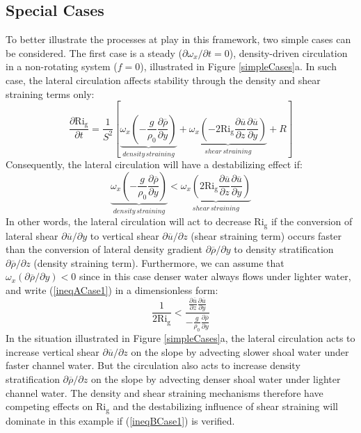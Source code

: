 \subsection{Special Cases}
To better illustrate the processes at play in this framework, two simple cases can be considered. The first case is a steady ($\partial \omega_x / \partial t = 0$), density-driven circulation in a non-rotating system ($f = 0$), illustrated in Figure \ref{simpleCases}a. In such case, the lateral circulation affects stability through the density and shear straining terms only:
\begin{equation}
\frac{\partial \mathrm{Ri_g}}{\partial t}=\frac{1}{S^{2}}\left[\underbrace{\omega_{x}\left(-\frac{g}{\rho_{0}}\frac{\partial \overline{\rho}}{\partial y}\right)}_{density\, straining}+\underbrace{\omega_{x}\left(-2\mathrm{Ri_g}\frac{\partial \overline{u}}{\partial z}\frac{\partial \overline{u}}{\partial y}\right)}_{shear\, straining}+R\right]
\label{drigdt_case1}
\end{equation}
Consequently, the lateral circulation will have a destabilizing effect if:
\begin{equation}
\underbrace{\omega_{x}\left(-\frac{g}{\rho_{0}}\frac{\partial \overline{\rho}}{\partial y}\right)}_{density\, straining} < \underbrace{\omega_{x}\left(2\mathrm{Ri_g}\frac{\partial \overline{u}}{\partial z}\frac{\partial \overline{u}}{\partial y}\right)}_{shear\, straining}
\label{ineqACase1}
\end{equation}
In other words, the lateral circulation will act to decrease $\mathrm{Ri_g}$ if the conversion of lateral shear $\partial \overline{u} / \partial y$ to vertical shear $\partial \overline{u} / \partial z$ (shear straining term) occurs faster than the conversion of lateral density gradient $\partial \overline{\rho} / \partial y$ to density stratification $\partial \overline{\rho} / \partial z$ (density straining term). Furthermore, we can assume that $\omega_x (\partial \overline{\rho} / \partial y) < 0$ since in this case denser water always flows under lighter water, and write (\ref{ineqACase1}) in a dimensionless form:
\begin{equation}
\frac{1}{2\mathrm{Ri_g}} < \frac{\frac{\partial \overline{u}}{\partial z}\frac{\partial \overline{u}}{\partial y}}{-\frac{g}{\rho_{0}}\frac{\partial \overline{\rho}}{\partial y}}
\label{ineqBCase1}
\end{equation}
In the situation illustrated in Figure \ref{simpleCases}a, the lateral circulation acts to increase vertical shear $\partial \overline{u} / \partial z$ on the slope by advecting slower shoal water under faster channel water. But the circulation also acts to increase density stratification  $\partial \overline{\rho} / \partial z$ on the slope by advecting denser shoal water under lighter channel water. The density and shear straining mechanisms therefore have competing effects on $\mathrm{Ri_g}$ and the destabilizing influence of shear straining will dominate in this example if (\ref{ineqBCase1}) is verified.

